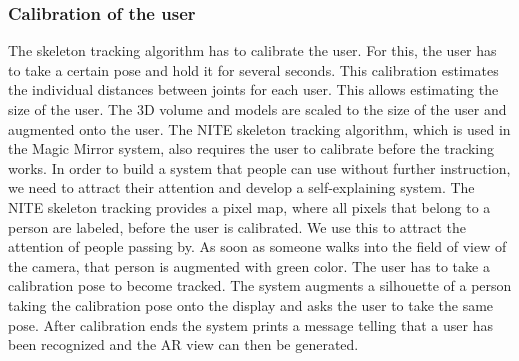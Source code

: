 {\subsubsection{Calibration of the user}
The skeleton tracking algorithm has to calibrate the user. For this, the user has to take a certain pose and hold it for several seconds. This calibration estimates the individual distances between joints for each user. This allows estimating the size of the user. The 3D volume and models are scaled to the size of the user and augmented onto the user.  
The NITE skeleton tracking algorithm, which is used in the Magic Mirror system, also requires the user to calibrate before the tracking works. In order to build a system that people can use without further instruction, we need to attract their attention and develop a self-explaining system. The NITE skeleton tracking provides a pixel map, where all pixels that belong to a person are labeled, before the user is calibrated. We use this to attract the attention of people passing by. As soon as someone walks into the field of view of the camera, that person is augmented with green color. The user has to take a calibration pose to become tracked. The system augments a silhouette of a person taking the calibration pose onto the display and asks the user to take the same pose. After calibration ends the system prints a message telling that a user has been recognized and the AR view can then be generated.

}
